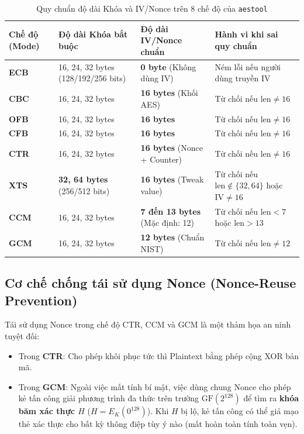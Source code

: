 \documentclass[12pt, a4paper]{report}
\begin{document}
\begin{table}[H]
\centering
\small
\caption{Quy chuẩn độ dài Khóa và IV/Nonce trên 8 chế độ của \texttt{aestool}}
\label{tab:validation}
\begin{tabular}{llll}
\toprule
\textbf{Chế độ (Mode)} & \textbf{Độ dài Khóa bắt buộc} & \textbf{Độ dài IV/Nonce chuẩn} & \textbf{Hành vi khi sai quy chuẩn} \\
\midrule
\textbf{ECB} & 16, 24, 32 bytes (128/192/256 bits) & \textbf{0 byte} (Không dùng IV) & Ném lỗi nếu người dùng truyền IV \\
\textbf{CBC} & 16, 24, 32 bytes & \textbf{16 bytes} (Khối AES) & Từ chối nếu $\text{len} \neq 16$ \\
\textbf{OFB} & 16, 24, 32 bytes & \textbf{16 bytes} & Từ chối nếu $\text{len} \neq 16$ \\
\textbf{CFB} & 16, 24, 32 bytes & \textbf{16 bytes} & Từ chối nếu $\text{len} \neq 16$ \\
\textbf{CTR} & 16, 24, 32 bytes & \textbf{16 bytes} (Nonce + Counter) & Từ chối nếu $\text{len} \neq 16$ \\
\textbf{XTS} & \textbf{32, 64 bytes} (256/512 bits) & \textbf{16 bytes} (Tweak value) & Từ chối nếu $\text{len} \notin \{32, 64\}$ hoặc $\text{IV} \neq 16$ \\
\textbf{CCM} & 16, 24, 32 bytes & \textbf{7 đến 13 bytes} (Mặc định: 12) & Từ chối nếu $\text{len} < 7$ hoặc $\text{len} > 13$ \\
\textbf{GCM} & 16, 24, 32 bytes & \textbf{12 bytes} (Chuẩn NIST) & Từ chối nếu $\text{len} \neq 12$ \\
\bottomrule
\end{tabular}
\end{table}

\subsection{Cơ chế chống tái sử dụng Nonce (Nonce-Reuse Prevention)}
Tái sử dụng Nonce trong chế độ CTR, CCM và GCM là một thảm họa an ninh tuyệt đối:
\begin{itemize}
    \item Trong \textbf{CTR}: Cho phép khôi phục tức thì Plaintext bằng phép cộng XOR bản mã.
    \item Trong \textbf{GCM}: Ngoài việc mất tính bí mật, việc dùng chung Nonce cho phép kẻ tấn công giải phương trình đa thức trên trường $\text{GF}(2^{128})$ để tìm ra \textbf{khóa băm xác thực $H$} ($H = E_K(0^{128})$). Khi $H$ bị lộ, kẻ tấn công có thể giả mạo thẻ xác thực cho bất kỳ thông điệp tùy ý nào (mất hoàn toàn tính toàn vẹn).
\end{itemize}
\end{document}
